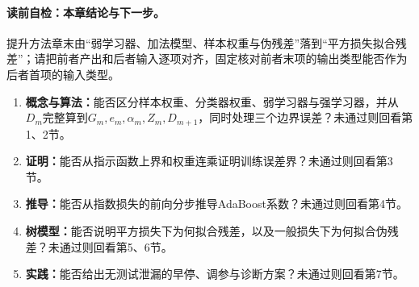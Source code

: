 \paragraph{读前自检：本章结论与下一步。}提升方法章末由“弱学习器、加法模型、样本权重与伪残差”落到“平方损失拟合残差”；请把前者产出和后者输入逐项对齐，固定核对前者末项的输出类型能否作为后者首项的输入类型。\par

\begin{SLCompactClosure}
\label{struct:V3-C03-CH36}

\label{struct:V3-C03-CH37}
\begin{selfcheckbox}
\begin{enumerate}[leftmargin=2.2em]
  \item \textbf{概念与算法：}能否区分样本权重、分类器权重、弱学习器与强学习器，并从$D_m$完整算到$G_m,e_m,\alpha_m,Z_m,D_{m+1}$，同时处理三个边界误差？未通过则回看第1、2节。
  \item \textbf{证明：}能否从指示函数上界和权重连乘证明训练误差界？未通过则回看第3节。
  \item \textbf{推导：}能否从指数损失的前向分步推导AdaBoost系数？未通过则回看第4节。
  \item \textbf{树模型：}能否说明平方损失下为何拟合残差，以及一般损失下为何拟合伪残差？未通过则回看第5、6节。
  \item \textbf{实践：}能否给出无测试泄漏的早停、调参与诊断方案？未通过则回看第7节。
\end{enumerate}
\end{selfcheckbox}
\end{SLCompactClosure}
